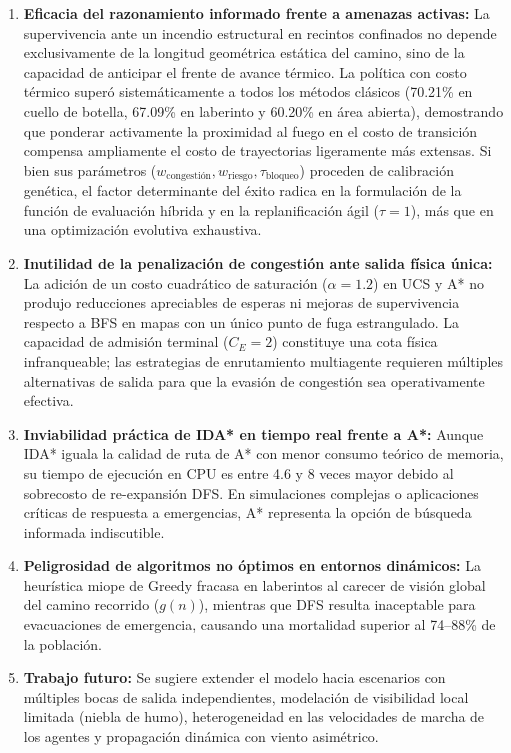 \documentclass[11pt,letterpaper]{article}
\begin{document}
\begin{enumerate}
    \item \textbf{Eficacia del razonamiento informado frente a amenazas activas:} La supervivencia ante un incendio estructural en recintos confinados no depende exclusivamente de la longitud geométrica estática del camino, sino de la capacidad de anticipar el frente de avance térmico. La política con costo térmico superó sistemáticamente a todos los métodos clásicos (70.21\% en cuello de botella, 67.09\% en laberinto y 60.20\% en área abierta), demostrando que ponderar activamente la proximidad al fuego en el costo de transición compensa ampliamente el costo de trayectorias ligeramente más extensas. Si bien sus parámetros ($w_{\text{congestión}}, w_{\text{riesgo}}, \tau_{\text{bloqueo}}$) proceden de calibración genética, el factor determinante del éxito radica en la formulación de la función de evaluación híbrida y en la replanificación ágil ($\tau=1$), más que en una optimización evolutiva exhaustiva.
    
    \item \textbf{Inutilidad de la penalización de congestión ante salida física única:} La adición de un costo cuadrático de saturación ($\alpha=1.2$) en UCS y A* no produjo reducciones apreciables de esperas ni mejoras de supervivencia respecto a BFS en mapas con un único punto de fuga estrangulado. La capacidad de admisión terminal ($C_E=2$) constituye una cota física infranqueable; las estrategias de enrutamiento multiagente requieren múltiples alternativas de salida para que la evasión de congestión sea operativamente efectiva.
    
    \item \textbf{Inviabilidad práctica de IDA* en tiempo real frente a A*:} Aunque IDA* iguala la calidad de ruta de A* con menor consumo teórico de memoria, su tiempo de ejecución en CPU es entre 4.6 y 8 veces mayor debido al sobrecosto de re-expansión DFS. En simulaciones complejas o aplicaciones críticas de respuesta a emergencias, A* representa la opción de búsqueda informada indiscutible.
    
    \item \textbf{Peligrosidad de algoritmos no óptimos en entornos dinámicos:} La heurística miope de Greedy fracasa en laberintos al carecer de visión global del camino recorrido ($g(n)$), mientras que DFS resulta inaceptable para evacuaciones de emergencia, causando una mortalidad superior al 74--88\% de la población.
    
    \item \textbf{Trabajo futuro:} Se sugiere extender el modelo hacia escenarios con múltiples bocas de salida independientes, modelación de visibilidad local limitada (niebla de humo), heterogeneidad en las velocidades de marcha de los agentes y propagación dinámica con viento asimétrico.
\end{enumerate}
\end{document}
